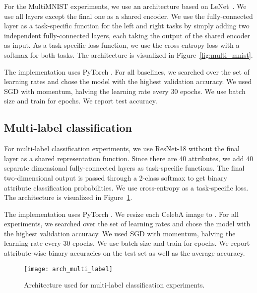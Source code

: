 \documentclass{article}
\begin{document}
For the MultiMNIST experiments, we use an architecture based on LeNet~\citep{mnist}. We use all layers except the final one as a shared encoder. We use the fully-connected layer as a task-specific function for the left and right tasks by simply adding two independent fully-connected layers, each taking the output of the shared encoder as input. As a task-specific loss function, we use the cross-entropy loss with a softmax for both tasks. The architecture is visualized in Figure~\ref{fig:multi_mnist}.

The implementation uses PyTorch \citep{pytorch}. For all baselines, we searched over the set  of learning rates and chose the model with the highest validation accuracy. We used SGD with momentum, halving the learning rate every 30 epochs. We use batch size  and train for  epochs. We report test accuracy.

\subsection{Multi-label classification}
For multi-label classification experiments, we use ResNet-18 \citep{resnet} without the final layer as a shared representation function. Since there are 40 attributes, we add 40 separate  dimensional fully-connected layers as task-specific functions. The final two-dimensional output is passed through a 2-class softmax to get binary attribute classification probabilities. We use cross-entropy as a task-specific loss. The architecture is visualized in Figure~\ref{fig:arch_multi_label}.

The implementation uses PyTorch \citep{pytorch}. We resize each CelebA image \citep{celeba} to . For all experiments, we searched over the set  of learning rates and chose the model with the highest validation accuracy. We used SGD with momentum, halving the learning rate every 30 epochs. We use batch size  and train for  epochs. We report attribute-wise binary accuracies on the test set as well as the average accuracy.

\begin{figure}[ht]
\texttt{[image: arch\_multi\_label]}
\caption{Architecture used for multi-label classification experiments.}
\label{fig:arch_multi_label}
\end{figure}
\end{document}
